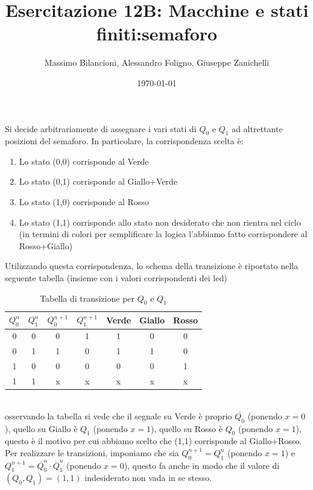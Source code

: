 \documentclass[12pt,a4paper]{article}
\date{\today}
\title{Esercitazione 12B: Macchine e stati finiti:semaforo}
\author{Massimo Bilancioni, Alessandro Foligno, Giuseppe Zanichelli}
\begin{document}
	
\maketitle
Si decide arbitrariamente di assegnare i vari stati di $Q_0$ e $Q_1$ ad altrettante posizioni del semaforo. In particolare, la corrispondenza scelta è:\\
\begin{enumerate}
	\item Lo stato (0,0) corrisponde al Verde
	\item Lo stato (0,1) corrisponde al Giallo+Verde
	\item Lo stato (1,0) corrisponde al Rosso
	\item Lo stato (1,1) corrisponde allo stato non desiderato che non rientra nel ciclo (in termini di colori per semplificare la  logica  l'abbiamo fatto corrispondere al Rosso+Giallo)
\end{enumerate}
Utilizzando questa corrispondenza, lo schema della transizione è riportato nella seguente tabella (insieme con i valori corrispondenti dei led)\
\begin{table}[h]\centering
\begin{tabular}{|c|c|c|c|c|c|c|}
	\hline 
	$Q_0^n$ & $Q_1^n$ & $Q_0^{n+1}$ & $Q_1^{n+1}$ & Verde & Giallo & Rosso \\ 
	\hline 
	0 & 0 & 0 & 1 & 1 & 0 & 0 \\ 
	\hline 
	0 & 1 & 1 & 0 & 1 & 1 & 0 \\ 
	\hline 
	1 & 0 & 0 & 0 & 0 & 0 & 1 \\ 
	\hline 
	1 & 1 & x & x & x & x & x \\ 
	\hline 
\end{tabular} 	
\caption{Tabella di transizione per $Q_0$ e $Q_1$}
\end{table}
\\
\noindent
osservando la tabella si vede che il segnale su Verde è proprio $\overline{Q_0}$ (ponendo $x =0$), quello su Giallo è $Q_1$ (ponendo $x= 1$), quello su Rosso è $Q_0$ (ponendo $x= 1$), questo è il motivo per cui abbiamo scelto che (1,1) corrisponde al Giallo+Rosso.\\
Per realizzare le transizioni, imponiamo che sia $Q_0^{n+1}=Q_1^n$ (ponendo $x= 1$)  e $Q_1^{n+1}=\overline{Q}_0^n \cdot \overline{Q}_1^n$ (ponendo $x= 0$), questo fa anche in modo che il valore di $(Q_0,Q_1)=(1,1)$ indesiderato non vada in se stesso.\\
\end{document}
